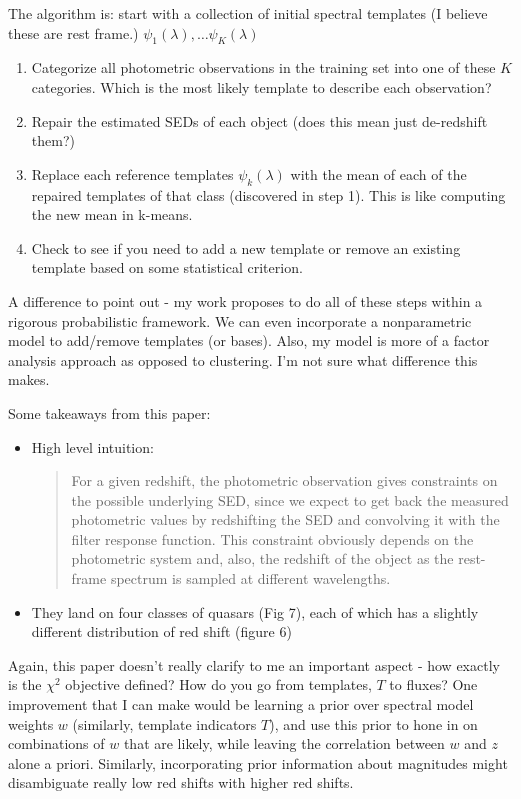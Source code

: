 \documentclass[11pt]{article}
\begin{document}
\begin{itemize}
The algorithm is: start with a collection of initial spectral templates (I believe these are rest frame.)  $\psi_1(\lambda), \dots \psi_K(\lambda)$
  \begin{enumerate}
  \item Categorize all photometric observations in the training set into one of these $K$ categories.  Which is the most likely template to describe each observation?
  \item Repair the estimated SEDs of each object (does this mean just de-redshift them?)
  \item Replace each reference templates $\psi_k(\lambda)$ with the mean of each of the repaired templates of that class (discovered in step 1).  This is like computing the new mean in k-means.  
  \item Check to see if you need to add a new template or remove an existing template based on some statistical criterion.  
  \end{enumerate}
  
A difference to point out - my work proposes to do all of these steps within a rigorous probabilistic framework.  We can even incorporate a nonparametric model to add/remove templates (or bases).  Also, my model is more of a factor analysis approach as opposed to clustering.  I'm not sure what difference this makes. 

Some takeaways from this paper: 
  \begin{itemize}
  \item High level intuition: 
    \begin{quote}
    For a given redshift, the photometric observation gives
constraints on the possible underlying SED, since we expect
to get back the measured photometric values by redshifting
the SED and convolving it with the filter response function.
This constraint obviously depends on the photometric
system and, also, the redshift of the object as the rest-frame
spectrum is sampled at different wavelengths.
    \end{quote}
  \item They land on four classes of quasars (Fig 7), each of which has a slightly different distribution of red shift (figure 6)
  \end{itemize}
  Again, this paper doesn't really clarify to me an important aspect - how exactly is the $\chi^2$ objective defined?  How do you go from templates, $T$ to fluxes?  One improvement that I can make would be learning a prior over spectral model weights $w$ (similarly, template indicators $T$), and use this prior to hone in on combinations of $w$ that are likely, while leaving the correlation between $w$ and $z$ alone a priori.  
  Similarly, incorporating prior information about magnitudes might disambiguate really low red shifts with higher red shifts.  


\end{itemize}
\end{document}
